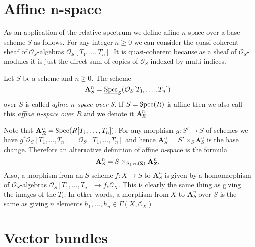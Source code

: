 \section{Affine n-space}
\label{section-affine-n-space}

\noindent
As an application of the relative spectrum
we define affine $n$-space over a base scheme
$S$ as follows. For any integer $n \geq 0$ we can consider the
quasi-coherent sheaf of $\mathcal{O}_S$-algebras
$\mathcal{O}_S[T_1, \ldots, T_n]$. It is quasi-coherent because
as a sheaf of $\mathcal{O}_S$-modules it is just the direct sum
of copies of $\mathcal{O}_S$ indexed by multi-indices.

\begin{definition}
\label{definition-affine-n-space}
Let $S$ be a scheme and $n \geq 0$.
The scheme
$$
\mathbf{A}^n_S =
\underline{\mathop{\rm Spec}}_S(\mathcal{O}_S[T_1, \ldots, T_n])
$$
over $S$ is called {\it affine $n$-space over $S$}.
If $S = \mathop{\rm Spec}(R)$ is affine then we also call this
{\it affine $n$-space over $R$} and we denote it $\mathbf{A}^n_R$.
\end{definition}

\noindent
Note that $\mathbf{A}^n_R = \mathop{\rm Spec}(R[T_1, \ldots, T_n])$.
For any morphism $g : S' \to S$ of schemes we have
$g^*\mathcal{O}_S[T_1, \ldots, T_n] = \mathcal{O}_{S'}[T_1, \ldots, T_n]$
and hence $\mathbf{A}^n_{S'} = S' \times_S \mathbf{A}^n_S$ is the base
change. Therefore an alternative definition of affine $n$-space
is the formula
$$
\mathbf{A}^n_S = S \times_{\mathop{\rm Spec}(\mathbf{Z})} \mathbf{A}^n_{\mathbf{Z}}.
$$
Also, a morphism from an $S$-scheme $f : X \to S$
to $\mathbf{A}^n_S$ is given by a homomorphism of 
$\mathcal{O}_S$-algebras
$\mathcal{O}_S[T_1, \ldots, T_n] \to f_*\mathcal{O}_X$.
This is clearly the same thing as giving the images of the $T_i$.
In other words, a morphism from $X$ to $\mathbf{A}^n_S$ over $S$
is the same as giving $n$ elements
$h_1, \ldots, h_n \in \Gamma(X, \mathcal{O}_X)$.

















\section{Vector bundles}
\label{section-vector-bundle}

